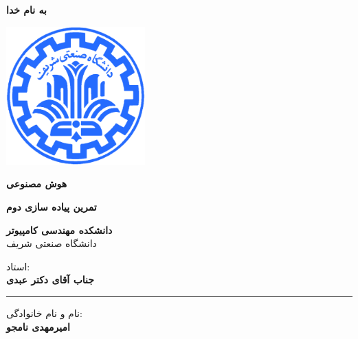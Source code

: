 \documentclass[12pt,titlepage,a4page , tikz , multi,table , svgnames,xcdraw]{article}
\begin{document}
\begin{titlepage}

 \begin{center}
        
       \vspace*{1cm}

 \vspace{1cm}
       \textbf{ \Huge{به نام خدا} }
       \vspace{0.4cm}
       
       \includegraphics[width=0.4\textwidth]{sharif1.png}
       
 	\vspace{0.7cm}
       \textbf{ \LARGE{هوش مصنوعی} }

 
   \vspace{0.7cm}
  \textbf{ \Large{ تمرین پیاده سازی دوم} }
   \vspace{0.5cm}
       
 
      \large \textbf{دانشکده مهندسی کامپیوتر}\\\vspace{0.2cm}
    \large   دانشگاه صنعتی شریف\\\vspace{0.25cm}
      
استاد:\\
    \textbf{{جناب آقای دکتر عبدی}}

    \vspace{0.25cm}
    \noindent\rule[1ex]{\linewidth}{3pt}
    
    \vspace{0.5cm}
نام و نام خانوادگی:\\
    \textbf{{امیرمهدی نامجو}}
        \vspace{0.1cm}

\end{center}
\end{titlepage}

\newpage
\pagestyle{fancy}
\fancyhf{}
\fancyfoot{}

\cfoot{\thepage}
\end{document}
